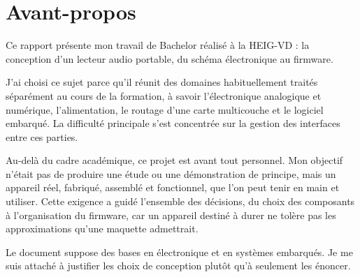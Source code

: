 \chapter*{Avant-propos}

Ce rapport présente mon travail de Bachelor réalisé à la HEIG-VD : la conception d'un lecteur audio portable, du schéma électronique au firmware.

J'ai choisi ce sujet parce qu'il réunit des domaines habituellement traités séparément au cours de la formation, à savoir l'électronique analogique et numérique, l'alimentation, le routage d'une carte multicouche et le logiciel embarqué. La difficulté principale s'est concentrée sur la gestion des interfaces entre ces parties.

Au-delà du cadre académique, ce projet est avant tout personnel. Mon objectif n'était pas de produire une étude ou une démonstration de principe, mais un appareil réel, fabriqué, assemblé et fonctionnel, que l'on peut tenir en main et utiliser. Cette exigence a guidé l'ensemble des décisions, du choix des composants à l'organisation du firmware, car un appareil destiné à durer ne tolère pas les approximations qu'une maquette admettrait.

Le document suppose des bases en électronique et en systèmes embarqués. Je me suis attaché à justifier les choix de conception plutôt qu'à seulement les énoncer.